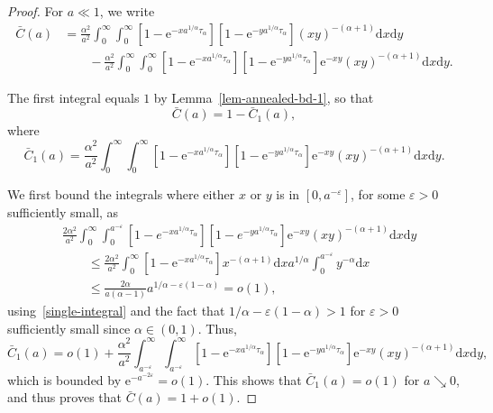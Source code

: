 \documentclass[10pt,a4paper]{amsart}
\newcommand{\e}{\mathrm{e}}
\newcommand{\nn}{\nonumber}
\begin{document}
\begin{proof}
    For $a\ll 1$, we write
\begin{align}
    \bar{C}(a)&=\frac{\alpha^2}{a^2} \int_{0}^{\infty} \int_{0}^{\infty}[1-\e^{-xa^{1/\alpha} {\tau_\alpha}}][1-\e^{-ya^{1/\alpha} {\tau_\alpha}}](xy)^{-(\alpha+1)}
	{\mathrm d}x {\mathrm d}y\\
	&\qquad-\frac{\alpha^2}{a^2} \int_{0}^{\infty} \int_{0}^{\infty}[1-\e^{-xa^{1/\alpha} {\tau_\alpha}}][1-\e^{-ya^{1/\alpha} {\tau_\alpha}}]\e^{-xy}(xy)^{-(\alpha+1)}
	{\mathrm d}x {\mathrm d}y.\nn
\end{align}

The first integral equals $1$ by Lemma~\ref{lem-annealed-bd-1}, so that
\begin{equation}
    \bar{C}(a) =1-\bar{C}_1(a),
\end{equation}
where
\begin{equation}
    \bar{C}_1(a)=\frac{\alpha^2}{a^2} \int_{0}^{\infty} \int_{0}^{\infty}[1-\e^{-xa^{1/\alpha} {\tau_\alpha}}][1-\e^{-ya^{1/\alpha} {\tau_\alpha}}]\e^{-xy}(xy)^{-(\alpha+1)}
	{\mathrm d}x {\mathrm d}y.
\end{equation}

We first bound the integrals where either $x$ or $y$ is in $[0,a^{-\varepsilon}]$, for some $\varepsilon>0$ sufficiently small, as 
\begin{align}
    &\frac{2\alpha^2}{a^2}\int_{0}^{\infty} \int_{0}^{a^{-\varepsilon}}[1-e^{-xa^{1/\alpha} {\tau_\alpha}}][1-e^{-ya^{1/\alpha} {\tau_\alpha}}]\e^{-xy}(xy)^{-(\alpha+1)}
	{\mathrm d}x {\mathrm d}y\\
    &\qquad \leq \frac{2\alpha^2}{a^2}\int_{0}^{\infty} [1-\e^{-xa^{1/\alpha} {\tau_\alpha}}] x^{-(\alpha+1)}{\mathrm d}x
	a^{1/\alpha} \int_{0}^{a^{-\varepsilon}} y^{-\alpha}{\mathrm d}x\nn\\
	&\qquad\leq \frac{2\alpha}{a(\alpha-1)} a^{1/\alpha-\varepsilon(1-\alpha)}=o(1),\nn
\end{align}
using~\eqref{single-integral} and the fact that $1/\alpha-\varepsilon(1-\alpha)>1$ for $\varepsilon>0$ sufficiently small since $\alpha\in (0,1)$. Thus,
\begin{equation}
    \bar{C}_1(a)=o(1)+\frac{\alpha^2}{a^2} \int_{a^{-\varepsilon}}^{\infty} \int_{a^{-\varepsilon}}^{\infty}[1-\e^{-xa^{1/\alpha} {\tau_\alpha}}][1-\e^{-ya^{1/\alpha} {\tau_\alpha}}] \e^{-xy}(xy)^{-(\alpha+1)}
	{\mathrm d}x {\mathrm d}y,
\end{equation}
which is bounded by $\e^{-a^{-2\varepsilon}}=o(1)$. This shows that $\bar{C}_1(a)=o(1)$ for $a\searrow 0$, and thus proves that $\bar{C}(a)=1+o(1)$.
\end{proof}
\end{document}
